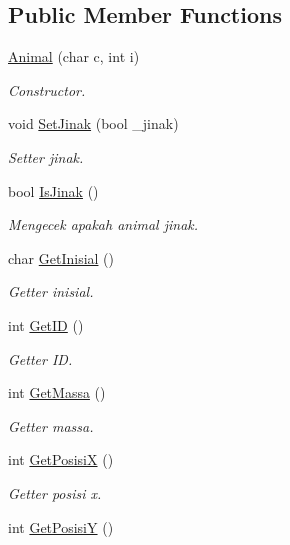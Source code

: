 \subsection*{Public Member Functions}
\begin{DoxyCompactItemize}
\item 
\hyperlink{classAnimal_a57dcbdda5c07d91a7f8fe94da97953fe}{Animal} (char c, int i)
\begin{DoxyCompactList}\small\item\em Constructor. \end{DoxyCompactList}\item 
void \hyperlink{classAnimal_ac6c9fc3c1f84fd9416ed8b584d892d3a}{Set\+Jinak} (bool \+\_\+jinak)
\begin{DoxyCompactList}\small\item\em Setter jinak. \end{DoxyCompactList}\item 
bool \hyperlink{classAnimal_a0068651e223252b68e634714f4e414ca}{Is\+Jinak} ()
\begin{DoxyCompactList}\small\item\em Mengecek apakah animal jinak. \end{DoxyCompactList}\item 
char \hyperlink{classAnimal_a98d6f1e3cbc08c981f7b11ecc5b3886e}{Get\+Inisial} ()
\begin{DoxyCompactList}\small\item\em Getter inisial. \end{DoxyCompactList}\item 
int \hyperlink{classAnimal_abfb32d0af74791999af1e7cebcff575d}{Get\+ID} ()
\begin{DoxyCompactList}\small\item\em Getter ID. \end{DoxyCompactList}\item 
int \hyperlink{classAnimal_a5c05eda69a23388786f54395654ba56f}{Get\+Massa} ()
\begin{DoxyCompactList}\small\item\em Getter massa. \end{DoxyCompactList}\item 
int \hyperlink{classAnimal_abcec270bc5610a32ddd9327847b4c72c}{Get\+PosisiX} ()
\begin{DoxyCompactList}\small\item\em Getter posisi x. \end{DoxyCompactList}\item 
int \hyperlink{classAnimal_a1adc84f7d029ae24c3236ea9ba5d083c}{Get\+PosisiY} ()

\end{DoxyCompactItemize}
